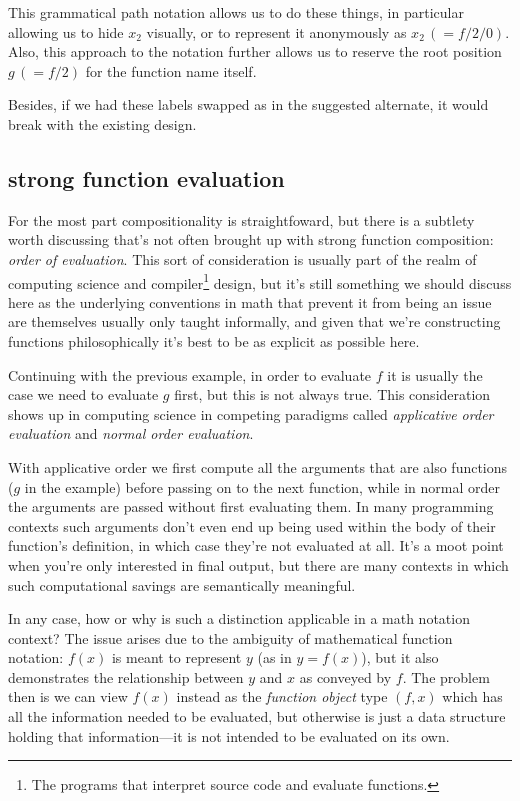 \documentclass[twoside]{article}
\begin{document}
This grammatical path notation allows us to do these things, in particular allowing us to hide $ x_2 $ visually,
or to represent it anonymously as $ x_2\,(=f/2/0) $. Also, this approach to the notation further allows us to reserve
the root position $ g\,(=f/2)$ for the function name itself.

Besides, if we had these labels swapped as in the suggested alternate, it would break with the existing design.

\subsection*{strong function evaluation}

For the most part compositionality is straightfoward, but there is a subtlety worth discussing that's not often brought
up with strong function composition: \emph{order of evaluation}. This sort of consideration is usually part of the
realm of computing science and compiler\footnote{The programs that interpret source code and evaluate functions.}
design, but it's still something we should discuss here as the underlying conventions in math that prevent
it from being an issue are themselves usually only taught informally, and given that we're constructing functions
philosophically it's best to be as explicit as possible here.

Continuing with the previous example, in order to evaluate $ f $ it is usually the case we need to evaluate $ g $
first, but this is not always true.  This consideration shows up in computing science in competing paradigms called
\emph{applicative order evaluation} and \emph{normal order evaluation}.

With applicative order we first compute all the arguments that are also functions ($ g $ in the example) before passing
on to the next function, while in normal order the arguments are passed without first evaluating them. In many programming
contexts such arguments don't even end up being used within the body of their function's definition, in which case they're
not evaluated at all.  It's a moot point when you're only interested in final output, but there are many contexts in which
such computational savings are semantically meaningful.

In any case, how or why is such a distinction applicable in a math notation context? The issue arises due to the ambiguity
of mathematical function notation: $ f(x) $ is meant to represent $ y $ (as in $ y=f(x) $), but it also demonstrates
the relationship between $ y $ and $ x $ as conveyed by $ f $. The problem then is we can view $ f(x) $ instead
as the \emph{function object} type $ (f,x) $ which has all the information needed to be evaluated, but otherwise
is just a data structure holding that information---it is not intended to be evaluated on its own.
\end{document}
